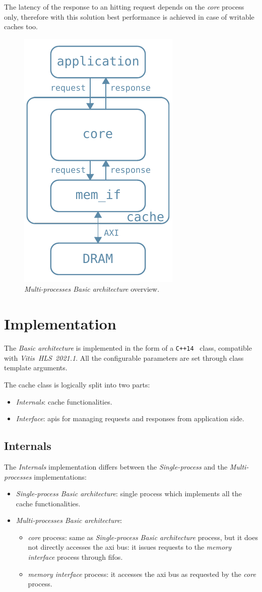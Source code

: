 \documentclass[11pt,a4paper,oneside]{memoir}
\begin{document}
The latency of the response to an hitting request depends on the \emph{core}
process only, therefore with this solution best performance is achieved in case
of writable caches too.

\begin{figure}
	\centering
	\includegraphics[width=.3\textwidth]{multi_proc_basic_arch}
	\caption{\emph{Multi-processes Basic architecture} overview.}
	\label{fig:multi_proc_basic_arch}
\end{figure}

\section{Implementation}
The \emph{Basic architecture} is implemented in the form of a
\texttt{C++14}~\cite{cpp14} class, compatible with
\emph{Vitis\texttrademark~HLS~2021.1}.
All the configurable parameters are set through class template arguments.

The cache class is logically split into two parts:
\begin{itemize}
	\item \emph{Internals}: cache functionalities.
	\item \emph{Interface}: \acsp{api} for managing requests and responses
		from application side.
\end{itemize}

\subsection{Internals}
The \emph{Internals} implementation differs between the \emph{Single-process}
and the \emph{Multi-processes} implementations:
\begin{itemize}
	\item \emph{Single-process Basic architecture}: single process which
		implements all the cache functionalities.
	\item \emph{Multi-processes Basic architecture}:
		\begin{itemize}
			\item \emph{core} process: same as \emph{Single-process
				Basic architecture} process, but it does not
				directly accesses the \ac{axi} bus: it issues
				requests to the \emph{memory interface} process
				through \acp{fifo}.
			\item \emph{memory interface} process: it accesses the
				\ac{axi} bus as requested by the \emph{core}
				process.
		\end{itemize}
\end{itemize}
\end{document}
